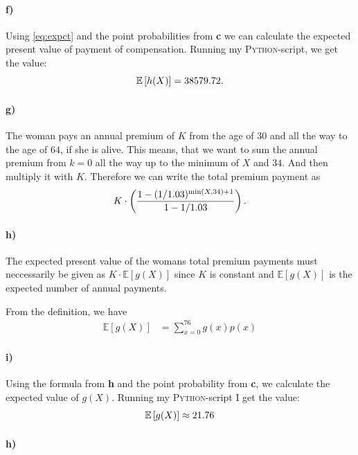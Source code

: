\documentclass[a4paper]{article}
\theoremstyle{definition}
\begin{document}
\paragraph{f)}
Using \eqref{eq:expct} and the point probabilities from \textbf{c} we can calculate
the expected present value of payment of compensation.
Running my \textsc{Python}-script, we get the value:
\begin{equation}
  \notag
  \mathbb{E}\left[ h(X) \right] = 38579.72.
\end{equation}

\paragraph{g)}
The woman pays an annual premium of $K$ from the age of $30$ and all the way to
the age of $64$, if she is alive. This means, that we want to sum the annual
premium from $k = 0$ all the way up to the minimum of $X$ and $34$. And then
multiply it with $K$.  Therefore we can write the total premium payment as
\begin{equation}
  \notag
  K \cdot \left( \frac{1 - (1/1.03)^{\min\left( X, 34 \right)+1}}{1 - 1/1.03} \right).
\end{equation}

\paragraph{h)}
The expected present value of the womans total premium payments must
neccessarily be given as $K \cdot \mathbb{E}\left[ g(X) \right]$ since $K$ is
constant and $\mathbb{E}\left[ g(X) \right]$ is the expected number of annual
payments.

From the definition, we have
\begin{align*}
  \label{eq:}
  \mathbb{E}\left[ g(X) \right] &= \sum_{x=0}^{76}g(x)p(x)
\end{align*}

\paragraph{i)}
Using the formula from \textbf{h} and the point probability from \textbf{c}, we
calculate the expected value of $g(X)$.  Running my \textsc{Python}-script I
get the value:
\begin{equation}
  \notag
  \mathbb{E}\left[ g(X) \right] \approx 21.76
\end{equation}
\paragraph{h)}
\end{document}
